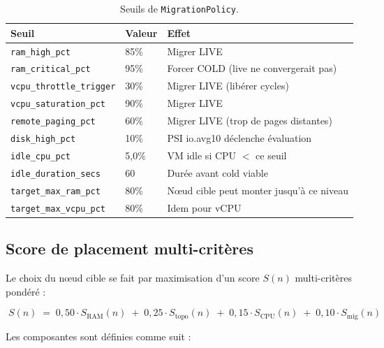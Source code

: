 \begin{table}[H]
\centering
\small
\caption{Seuils de \texttt{MigrationPolicy}.}
\begin{tabular}{llp{7cm}}
\toprule
\textbf{Seuil} & \textbf{Valeur} & \textbf{Effet} \\
\midrule
\texttt{ram\_high\_pct}         & 85\%        & Migrer LIVE \\
\texttt{ram\_critical\_pct}     & 95\%        & Forcer COLD (live ne convergerait pas) \\
\texttt{vcpu\_throttle\_trigger} & 30\%       & Migrer LIVE (libérer cycles) \\
\texttt{vcpu\_saturation\_pct}  & 90\%        & Migrer LIVE \\
\texttt{remote\_paging\_pct}    & 60\%        & Migrer LIVE (trop de pages distantes) \\
\texttt{disk\_high\_pct}        & 10\%        & PSI io.avg10 déclenche évaluation \\
\texttt{idle\_cpu\_pct}         & 5,0\%       & VM idle si CPU $<$ ce seuil \\
\texttt{idle\_duration\_secs}   & 60          & Durée avant cold viable \\
\texttt{target\_max\_ram\_pct}  & 80\%        & Nœud cible peut monter jusqu'à ce niveau \\
\texttt{target\_max\_vcpu\_pct} & 80\%        & Idem pour vCPU \\
\bottomrule
\end{tabular}
\label{tab:migration-seuils}
\end{table}

\subsection{Score de placement multi-critères}

Le choix du nœud cible se fait par maximisation d'un score $S(n)$ multi-critères pondéré :

\begin{equation}
\boxed{\;
S(n) \;=\; 0{,}50 \cdot S_{\text{RAM}}(n) \;+\; 0{,}25 \cdot S_{\text{topo}}(n) \;+\; 0{,}15 \cdot S_{\text{CPU}}(n) \;+\; 0{,}10 \cdot S_{\text{mig}}(n)
\;}
\label{eq:score}
\end{equation}

Les composantes sont définies comme suit :


